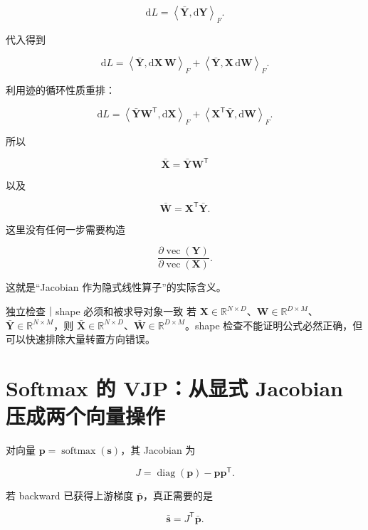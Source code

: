 \documentclass[profile=standard,twoside=false]{ipara-handbook}
\begin{document}
$$
\mathrm{d}L
=\left\langle\bar{\boldsymbol{Y}},\mathrm{d}\boldsymbol{Y}\right\rangle_F.
$$

代入得到

$$
\mathrm{d}L
=\left\langle\bar{\boldsymbol{Y}},\mathrm{d}\boldsymbol{X}\,\boldsymbol{W}\right\rangle_F
+\left\langle\bar{\boldsymbol{Y}},\boldsymbol{X}\,\mathrm{d}\boldsymbol{W}\right\rangle_F.
$$

利用迹的循环性质重排：

$$
\mathrm{d}L
=\left\langle\bar{\boldsymbol{Y}}\boldsymbol{W}^{\mathsf T},\mathrm{d}\boldsymbol{X}\right\rangle_F
+\left\langle\boldsymbol{X}^{\mathsf T}\bar{\boldsymbol{Y}},\mathrm{d}\boldsymbol{W}\right\rangle_F.
$$

所以

$$
\boxed{
\bar{\boldsymbol{X}}
=\bar{\boldsymbol{Y}}\boldsymbol{W}^{\mathsf T}
}
$$

以及

$$
\boxed{
\bar{\boldsymbol{W}}
=\boldsymbol{X}^{\mathsf T}\bar{\boldsymbol{Y}}
}.
$$

这里没有任何一步需要构造

$$
\frac{\partial\operatorname{vec}(\boldsymbol{Y})}
{\partial\operatorname{vec}(\boldsymbol{X})}.
$$

这就是“Jacobian 作为隐式线性算子”的实际含义。

\begin{criterion}{独立检查｜shape 必须和被求导对象一致}
若 $\boldsymbol{X}\in\mathbb{R}^{N\times D}$、$\boldsymbol{W}\in\mathbb{R}^{D\times M}$、$\bar{\boldsymbol{Y}}\in\mathbb{R}^{N\times M}$，则 $\bar{\boldsymbol{X}}\in\mathbb{R}^{N\times D}$、$\bar{\boldsymbol{W}}\in\mathbb{R}^{D\times M}$。shape 检查不能证明公式必然正确，但可以快速排除大量转置方向错误。
\end{criterion}

\section{Softmax 的 VJP：从显式 Jacobian 压成两个向量操作}

对向量 $\boldsymbol{p}=\operatorname{softmax}(\boldsymbol{s})$，其 Jacobian 为

$$
J
=\operatorname{diag}(\boldsymbol{p})
-\boldsymbol{p}\boldsymbol{p}^{\mathsf T}.
$$

若 backward 已获得上游梯度 $\bar{\boldsymbol{p}}$，真正需要的是

$$
\bar{\boldsymbol{s}}
=J^{\mathsf T}\bar{\boldsymbol{p}}.
$$
\end{document}
